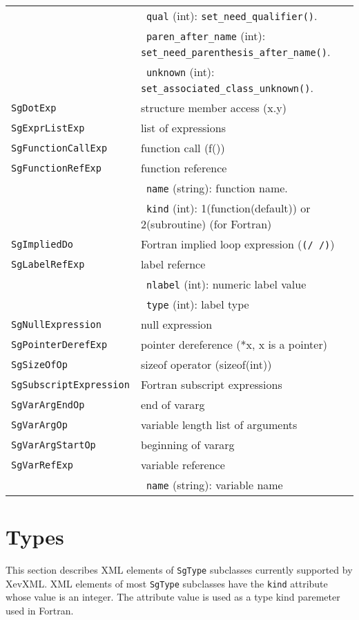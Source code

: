 \begin{longtable}[l]{l|p{10cm}}
 & ~\texttt{qual} (int): \texttt{set\_need\_qualifier()}.\\
 & ~\texttt{paren\_after\_name} (int): \texttt{set\_need\_parenthesis\_after\_name()}.\\
 & ~\texttt{unknown} (int): \texttt{set\_associated\_class\_unknown()}.\\
 \texttt{SgDotExp} & structure member access (x.y)\\
 \texttt{SgExprListExp} & list of expressions \\
 \texttt{SgFunctionCallExp} & function call  (f())\\
 \texttt{SgFunctionRefExp} & function reference\\
 & ~\texttt{name} (string): function name. \\
 & ~\texttt{kind} (int): 1(function(default)) or 2(subroutine) (for Fortran)\\
 \texttt{SgImpliedDo} & Fortran implied loop expression (\texttt{(/ /)})\\
 \texttt{SgLabelRefExp} & label refernce\\
 & ~\texttt{nlabel} (int): numeric label value\\
 & ~\texttt{type} (int): label type\\
 \texttt{SgNullExpression} & null expression \\
 \texttt{SgPointerDerefExp} & pointer dereference (*x, x is a pointer)\\
 \texttt{SgSizeOfOp} & sizeof operator (sizeof(int))\\
 \texttt{SgSubscriptExpression} & Fortran subscript expressions \\
 \texttt{SgVarArgEndOp} & end of vararg\\
 \texttt{SgVarArgOp} & variable length list of arguments \\
 \texttt{SgVarArgStartOp} & beginning of vararg\\
 \texttt{SgVarRefExp} & variable reference \\
 & ~\texttt{name} (string): variable name \\
\end{longtable}


\section{Types}

This section describes XML elements of \texttt{SgType} subclasses
currently supported by XevXML.  XML elements of most \texttt{SgType}
subclasses have the \texttt{kind} attribute whose value is an
integer. The attribute value is used as a type kind paremeter used in
Fortran.

